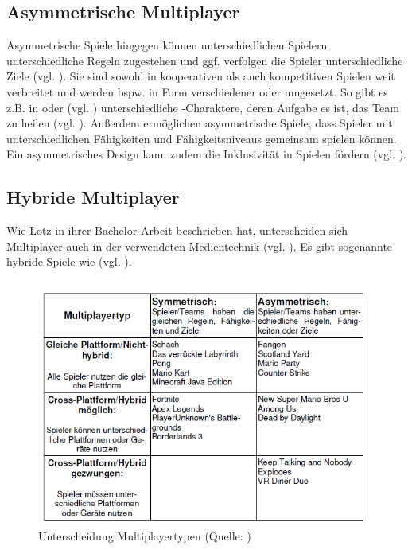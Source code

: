 \subsection{Asymmetrische Multiplayer}
Asymmetrische Spiele hingegen können unterschiedlichen Spielern unterschiedliche Regeln zugestehen und ggf. verfolgen die Spieler unterschiedliche Ziele (vgl. \citealp[S. 12]{adams_fundamentals_2013}). Sie sind sowohl in kooperativen als auch kompetitiven Spielen weit verbreitet und werden bspw. in Form verschiedener  oder  umgesetzt. So gibt es z.B. in  oder  (vgl. \citealp{noauthor_league_2025, noauthor_overwatch_nodate}) unterschiedliche -Charaktere, deren Aufgabe es ist, das Team zu heilen (vgl. \citealp[S. 307f]{smilovitch_birdquestvr_2019}).
Außerdem ermöglichen asymmetrische Spiele, dass Spieler mit unterschiedlichen Fähigkeiten und Fähigkeitsniveaus gemeinsam spielen können. Ein asymmetrisches Design kann zudem die Inklusivität in Spielen fördern (vgl. \citealp[S. 308]{smilovitch_birdquestvr_2019}).

\subsection{Hybride Multiplayer}\label{sec:hybrid-multiplayer}
Wie Lotz in ihrer Bachelor-Arbeit beschrieben hat, unterscheiden sich Multiplayer auch in der verwendeten Medientechnik (vgl. \citealp[S. 6f]{lotz_konzeption_2021}). Es gibt sogenannte hybride Spiele wie  (vgl. \citealp{nintendo_mario_2012}).

\begin{figure}[ht]
\centering
\includegraphics[width=1\linewidth]{content/pictures/lotz_hybrid_multiplayer.PNG}
\caption{Unterscheidung Multiplayertypen (Quelle: \citealp[S.6]{lotz_konzeption_2021})}
\label{fig:lotz_multiplayer_types}
\end{figure}


